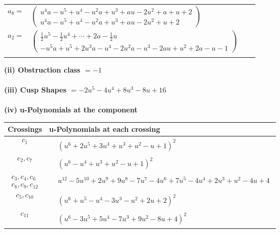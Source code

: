 \documentclass[1p]{elsarticle_modified}
\theoremstyle{definition}
\begin{document}
\begin{tabular}{m{7pt} m{180pt} m{7pt} m{180pt} }
\flushright $a_{8}=$&$\begin{pmatrix}u^4 a- u^5+u^4- u^2 a+u^3+a u-2 u^2+a+u+2\\u^4 a- u^5+u^4- u^2 a+u^3+a u-2 u^2+u+2\end{pmatrix}$ \\
\flushright $a_{2}=$&$\begin{pmatrix}\frac{1}{2} u^5-\frac{1}{2} u^4+\cdots+2 a-\frac{1}{2} u\\- u^5 a+u^5+2 u^3 a- u^4-2 u^2 a- u^3-2 a u+u^2+2 a- u-1\end{pmatrix}$\\&\end{tabular}
\flushleft \textbf{(ii) Obstruction class $= -1$}\\~\\
\flushleft \textbf{(iii) Cusp Shapes $= -2 u^5-4 u^4+8 u^3-8 u+16$}\\~\\
\newpage\renewcommand{\arraystretch}{1}
\flushleft \textbf{(iv) u-Polynomials at the component}\newline \\
\begin{tabular}{m{50pt}|m{274pt}}
Crossings & \hspace{64pt}u-Polynomials at each crossing \\
\hline $$\begin{aligned}c_{1}\end{aligned}$$&$\begin{aligned}
&(u^6+2 u^5+3 u^4+u^3+u^2- u+1)^2
\end{aligned}$\\
\hline $$\begin{aligned}c_{2},c_{7}\end{aligned}$$&$\begin{aligned}
&(u^6- u^4+u^3+u^2- u+1)^2
\end{aligned}$\\
\hline $$\begin{aligned}c_{3},c_{4},c_{6}\\c_{8},c_{9},c_{12}\end{aligned}$$&$\begin{aligned}
&u^{12}-5 u^{10}+2 u^9+9 u^8-7 u^7-4 u^6+7 u^5-4 u^4+2 u^3+u^2-4 u+4
\end{aligned}$\\
\hline $$\begin{aligned}c_{5},c_{10}\end{aligned}$$&$\begin{aligned}
&(u^6+u^5- u^4-3 u^3- u^2+2 u+2)^2
\end{aligned}$\\
\hline $$\begin{aligned}c_{11}\end{aligned}$$&$\begin{aligned}
&(u^6-3 u^5+5 u^4-7 u^3+9 u^2-8 u+4)^2
\end{aligned}$\\
\hline
\end{tabular}\\~\\
\end{document}
